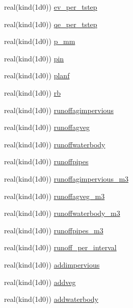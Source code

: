 \begin{DoxyCompactItemize}
\item 
real(kind(1d0)) \hyperlink{namespacesues__data_a11bc80be13a121686d39d355d6c98aa9}{ev\+\_\+per\+\_\+tstep}
\item 
real(kind(1d0)) \hyperlink{namespacesues__data_a8506404b27e8b0ded77802f2ab475928}{qe\+\_\+per\+\_\+tstep}
\item 
real(kind(1d0)) \hyperlink{namespacesues__data_a9ddcc1842e650815dfc06fa4a3bf6a78}{p\+\_\+mm}
\item 
real(kind(1d0)) \hyperlink{namespacesues__data_aa2d35158f50e5437170a36712c99a891}{pin}
\item 
real(kind(1d0)) \hyperlink{namespacesues__data_a0489c46c970c2dd6ecdf0af0e11dee21}{planf}
\item 
real(kind(1d0)) \hyperlink{namespacesues__data_a90293da57db1b1a3a4bc0979d2005640}{rb}
\item 
real(kind(1d0)) \hyperlink{namespacesues__data_ac376fe6389c7367c307fce12d816009c}{runoffagimpervious}
\item 
real(kind(1d0)) \hyperlink{namespacesues__data_ac2654954c97c2cbba667e51f44850250}{runoffagveg}
\item 
real(kind(1d0)) \hyperlink{namespacesues__data_a0fce415bc7210db0cfe37ded2d8c1ef5}{runoffwaterbody}
\item 
real(kind(1d0)) \hyperlink{namespacesues__data_a20b9d66de8207bb6709f620aebc98b17}{runoffpipes}
\item 
real(kind(1d0)) \hyperlink{namespacesues__data_a56bf7a98188b09dfcd2c9daed991f1b0}{runoffagimpervious\+\_\+m3}
\item 
real(kind(1d0)) \hyperlink{namespacesues__data_a030c38cf6a2cc1b2121491399a0353a5}{runoffagveg\+\_\+m3}
\item 
real(kind(1d0)) \hyperlink{namespacesues__data_abc5b5ae18f30abb3a858e2e24e1e99d7}{runoffwaterbody\+\_\+m3}
\item 
real(kind(1d0)) \hyperlink{namespacesues__data_ac5a856a3cdf4ba0b3a9150f2a08bb13d}{runoffpipes\+\_\+m3}
\item 
real(kind(1d0)) \hyperlink{namespacesues__data_a3e74512061da577d1697d50324b5ea28}{runoff\+\_\+per\+\_\+interval}
\item 
real(kind(1d0)) \hyperlink{namespacesues__data_af0fed458b1eefc0164c4ffb6d6e2d1a2}{addimpervious}
\item 
real(kind(1d0)) \hyperlink{namespacesues__data_a2553d0e5b7218422246f2078b379fed5}{addveg}
\item 
real(kind(1d0)) \hyperlink{namespacesues__data_aa314ccdf6d41a3901fa922504f030203}{addwaterbody}

\end{DoxyCompactItemize}
